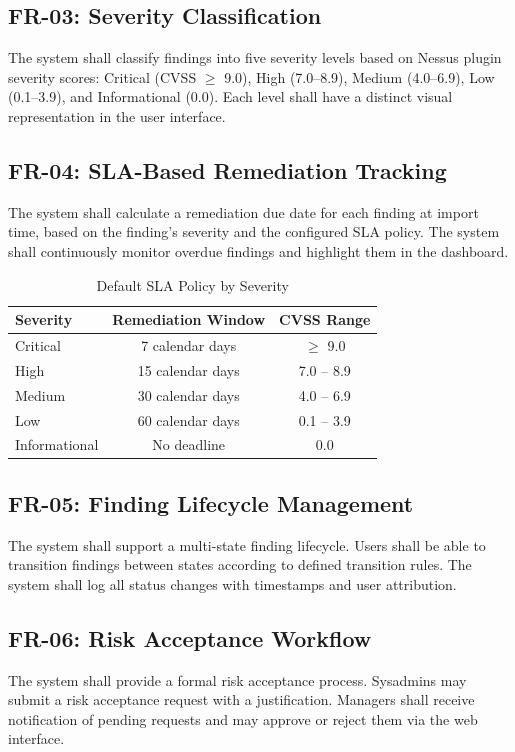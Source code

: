 \subsection{FR-03: Severity Classification}
The system shall classify findings into five severity levels based on Nessus plugin severity scores: Critical (CVSS $\geq$ 9.0), High (7.0--8.9), Medium (4.0--6.9), Low (0.1--3.9), and Informational (0.0). Each level shall have a distinct visual representation in the user interface.

\subsection{FR-04: SLA-Based Remediation Tracking}
The system shall calculate a remediation due date for each finding at import time, based on the finding's severity and the configured SLA policy. The system shall continuously monitor overdue findings and highlight them in the dashboard.

\begin{table}[H]
\centering
\caption{Default SLA Policy by Severity}
\label{tab:sla}
\begin{tabular}{lcc}
\toprule
\textbf{Severity} & \textbf{Remediation Window} & \textbf{CVSS Range} \\
\midrule
Critical & 7 calendar days & $\geq$ 9.0 \\
High & 15 calendar days & 7.0 -- 8.9 \\
Medium & 30 calendar days & 4.0 -- 6.9 \\
Low & 60 calendar days & 0.1 -- 3.9 \\
Informational & No deadline & 0.0 \\
\bottomrule
\end{tabular}
\end{table}

\subsection{FR-05: Finding Lifecycle Management}
The system shall support a multi-state finding lifecycle. Users shall be able to transition findings between states according to defined transition rules. The system shall log all status changes with timestamps and user attribution.

\subsection{FR-06: Risk Acceptance Workflow}
The system shall provide a formal risk acceptance process. Sysadmins may submit a risk acceptance request with a justification. Managers shall receive notification of pending requests and may approve or reject them via the web interface.

